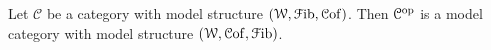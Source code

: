 \documentclass[main.tex]{subfiles}
\begin{document}
\begin{example}
\begin{enumerate}


  \end{enumerate}
\end{example}

\begin{example}
  \label{eg:opposite_model_category}
  Let $\mathcal{C}$ be a category with model structure $(\mathcal{W}, \mathcal{F}\mathrm{ib}, \mathcal{C}\mathrm{of})$. Then $\mathcal{C}^{\mathrm{op}}$ is a model category with model structure $(\mathcal{W}, \mathcal{C}\mathrm{of}, \mathcal{F}\mathrm{ib})$.
\end{example}
\end{document}
